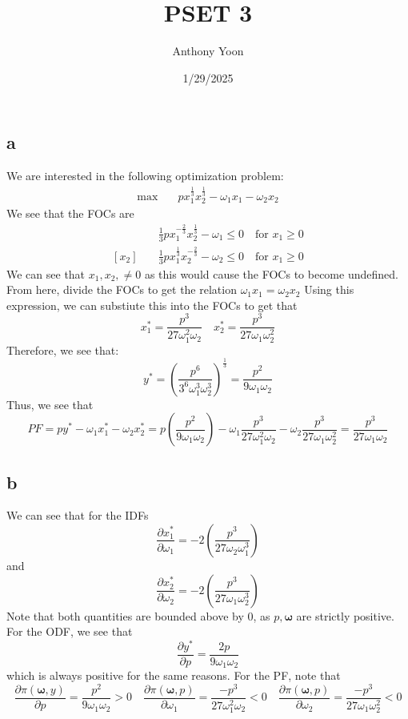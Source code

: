 \documentclass[11pt]{article}
\title{PSET 3}
\author{Anthony Yoon}
\date{1/29/2025}
\begin{document}
\maketitle
\section{}
\subsection*{a}
We are interested in the following optimization problem:
\begin{align*}
    \max & \quad px^\frac{1}{3}_1x^\frac{1}{3}_2 - \omega_1x_1 - \omega_2x_2
\end{align*}
We see that the FOCs are 
\begin{align*}
    [x_1] & \quad \frac{1}{3} p x_1^{-\frac{2}{3}} x_2^\frac{1}{3} - \omega_1 \leq 0 \quad \text{for }  x_1 \geq 0 \\
    [x_2] & \quad \frac{1}{3} px_1^\frac{1}{3}x_2^{-\frac{2}{3}} - \omega_2 \leq 0 \quad \text{for } x_1 \geq 0
\end{align*}
We can see that $x_1, x_2, \neq 0$ as this would cause the FOCs to become undefined. From here, divide the FOCs to get the relation $\omega_1 x_1 = \omega_2 x_2$ Using this expression, we can substiute this into the FOCs to get that 
\[
x_1^* = \frac{p^3}{27\omega_1^2\omega_2} \quad x_2^* = \frac{p^3}{27\omega_1\omega_2^2}
\]
Therefore, we see that:
\[
y^* = \left( \frac{p^6}{3^6\omega_1^3\omega_2^3} \right)^\frac{1}{3} = \frac{p^2}{9\omega_1\omega_2}
\]
Thus, we see that 
\[
PF = py^* - \omega_1x_1^* - \omega_2x_2^* = p \left( \frac{p^2}{9\omega_1\omega_2} \right) - \omega_1 \frac{p^3}{27\omega_1^2\omega_2} - \omega_2\frac{p^3}{27\omega_1\omega_2^2} = \frac{p^3}{27\omega_1\omega_2}
\]
\subsection*{b}
We can see that for the IDFs
\[
\frac{\partial x_1^*}{\partial \omega_1} = -2 \left( \frac{p^3}{27\omega_2\omega_1^3} \right)
\]
and 
\[
\frac{\partial x_2^*}{\partial \omega_2} = -2 \left( \frac{p^3}{27\omega_1\omega_2^3} \right)
\]
Note that both quantities are bounded above by 0, as $p, \mathbf{\omega}$ are strictly positive. For the ODF, we see that 
\[
\frac{\partial y^*}{\partial p} = \frac{2p}{9\omega_1\omega_2}
\]
which is always positive for the same reasons. For the PF, note that 
\[
\frac{\partial \pi(\mathbf{\omega}, y)}{\partial p} = \frac{p^2}{9\omega_1\omega_2} > 0 \quad \frac{\partial \pi(\mathbf{\omega}, p)}{\partial \omega_1} = \frac{-p^3}{27\omega_1^2\omega_2} <0 \quad \frac{\partial \pi(\mathbf{\omega}, p)}{\partial \omega_2} = \frac{-p^3}{27\omega_1\omega_2^2} <0 
\]
\end{document}
